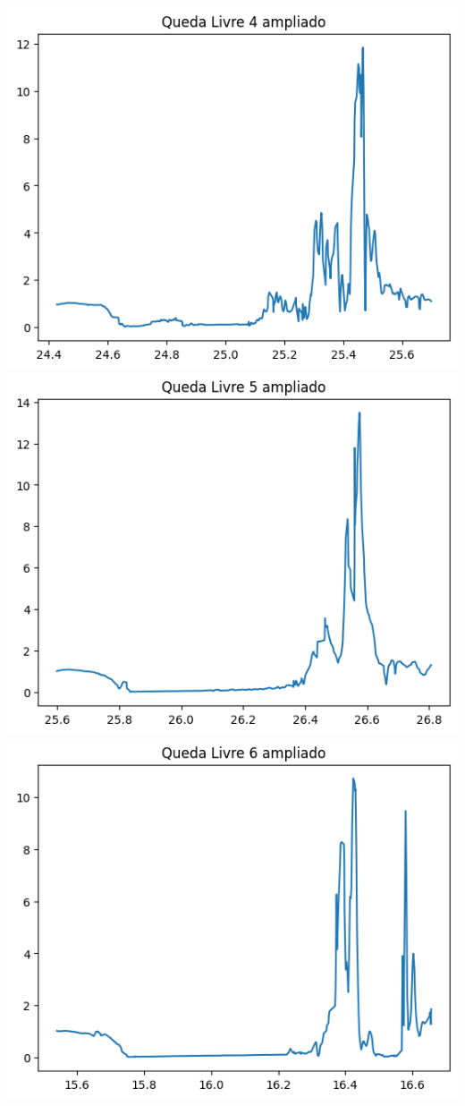 \documentclass{article}
\begin{document}
\includegraphics{Q4.png}\\
\includegraphics{Q5.png}\\
\includegraphics{Q6.png}\\
\end{document}
